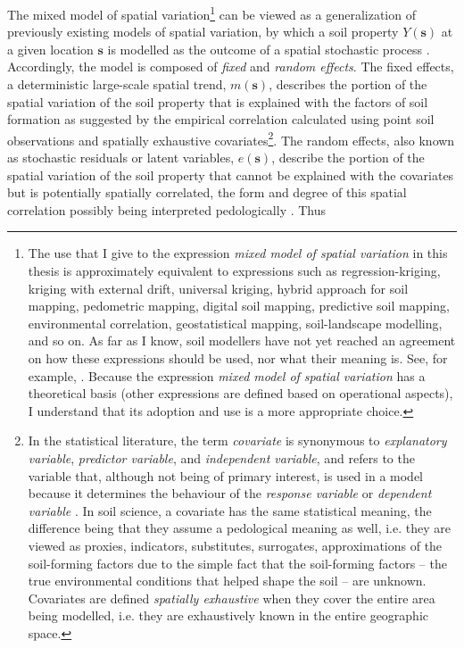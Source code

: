 The mixed model of spatial variation\footnote{The use that I give to the expression \emph{mixed model of 
spatial variation} in this thesis is approximately equivalent to expressions such as regression-kriging, 
kriging with external drift, universal kriging, hybrid approach for soil mapping, pedometric mapping, digital 
soil mapping, predictive soil mapping, environmental correlation, geostatistical mapping, soil-landscape 
modelling, and so on. As far as I know, soil modellers have not yet reached an agreement on how these 
 expressions should be used, nor what their  meaning is. See, for example, 
. Because the expression \emph{mixed model of spatial 
variation} has a theoretical basis (other expressions are defined based on operational aspects), I understand 
that its adoption and use is a more appropriate choice.} can be viewed as a generalization of previously 
existing models of spatial variation, by which a soil property $Y(\boldsymbol{s})$ at a given location 
$\boldsymbol{s}$ is modelled as the outcome of a spatial stochastic process \cite{Cressie1993, 
HeuvelinkEtAl2001, LarkEtAl2006}. Accordingly, the model is composed of \emph{fixed} and \emph{random effects}. 
The fixed effects, a deterministic large-scale spatial trend, $m(\boldsymbol{s})$, describes the portion of the 
spatial variation of the soil property that is explained with the factors of soil formation as suggested by the 
empirical correlation calculated using point soil observations and spatially exhaustive covariates\footnote{In 
the statistical literature, the term \emph{covariate} is synonymous to \emph{explanatory variable}, 
\emph{predictor variable}, and \emph{independent variable}, and refers to the variable that, although not being 
of primary interest, is used in a model because it determines the behaviour of the \emph{response variable} or 
\emph{dependent variable} \cite{Everitt2006}. In soil science, a covariate has the same statistical meaning, 
the difference being that they assume a pedological meaning as well, i.e. they are viewed as proxies, 
indicators, substitutes, surrogates, approximations of the soil-forming factors due to the simple fact that the 
soil-forming factors -- the true environmental conditions that helped shape the soil -- are unknown. Covariates 
are defined \emph{spatially exhaustive} when they cover the entire area being modelled, i.e. they are 
exhaustively known in the entire geographic space.}. The random effects, also known as stochastic residuals or 
latent variables, $e(\boldsymbol{s})$, describe the portion of the spatial variation of the soil property that 
cannot be explained with the covariates but is potentially spatially correlated, the form and degree of this 
spatial correlation possibly being interpreted pedologically \cite{Lark2012}. Thus 

